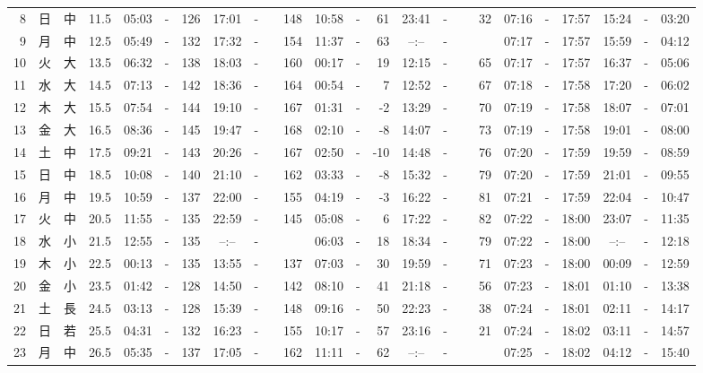 \documentclass[12pt,a4j]{jsarticle}
\begin{document}
\begin{table}[htbp]
\begin{center}
{\begin{tabular}{|rc|cr|ccrccr|ccrccr|ccc|ccc|}
 8 & 日 & 中 & 11.5 &  05:03 &-& 126 &  17:01 &-& 148 &  10:58 &-&  61 &  23:41 &-&  32 & 07:16 & -& 17:57 & 15:24 & -& 03:20 \\
 9 & 月 & 中 & 12.5 &  05:49 &-& 132 &  17:32 &-& 154 &  11:37 &-&  63 &  --:-- &-&~~~~~ & 07:17 & -& 17:57 & 15:59 & -& 04:12 \\
10 & 火 & 大 & 13.5 &  06:32 &-& 138 &  18:03 &-& 160 &  00:17 &-&  19 &  12:15 &-&  65 & 07:17 & -& 17:57 & 16:37 & -& 05:06 \\
11 & 水 & 大 & 14.5 &  07:13 &-& 142 &  18:36 &-& 164 &  00:54 &-&   7 &  12:52 &-&  67 & 07:18 & -& 17:58 & 17:20 & -& 06:02 \\
12 & 木 & 大 & 15.5 &  07:54 &-& 144 &  19:10 &-& 167 &  01:31 &-&  -2 &  13:29 &-&  70 & 07:19 & -& 17:58 & 18:07 & -& 07:01 \\
13 & 金 & 大 & 16.5 &  08:36 &-& 145 &  19:47 &-& 168 &  02:10 &-&  -8 &  14:07 &-&  73 & 07:19 & -& 17:58 & 19:01 & -& 08:00 \\
14 & 土 & 中 & 17.5 &  09:21 &-& 143 &  20:26 &-& 167 &  02:50 &-& -10 &  14:48 &-&  76 & 07:20 & -& 17:59 & 19:59 & -& 08:59 \\
15 & 日 & 中 & 18.5 &  10:08 &-& 140 &  21:10 &-& 162 &  03:33 &-&  -8 &  15:32 &-&  79 & 07:20 & -& 17:59 & 21:01 & -& 09:55 \\
16 & 月 & 中 & 19.5 &  10:59 &-& 137 &  22:00 &-& 155 &  04:19 &-&  -3 &  16:22 &-&  81 & 07:21 & -& 17:59 & 22:04 & -& 10:47 \\
17 & 火 & 中 & 20.5 &  11:55 &-& 135 &  22:59 &-& 145 &  05:08 &-&   6 &  17:22 &-&  82 & 07:22 & -& 18:00 & 23:07 & -& 11:35 \\
18 & 水 & 小 & 21.5 &  12:55 &-& 135 &  --:-- &-&~~~~~ &  06:03 &-&  18 &  18:34 &-&  79 & 07:22 & -& 18:00 & --:-- & -& 12:18 \\
19 & 木 & 小 & 22.5 &  00:13 &-& 135 &  13:55 &-& 137 &  07:03 &-&  30 &  19:59 &-&  71 & 07:23 & -& 18:00 & 00:09 & -& 12:59 \\
20 & 金 & 小 & 23.5 &  01:42 &-& 128 &  14:50 &-& 142 &  08:10 &-&  41 &  21:18 &-&  56 & 07:23 & -& 18:01 & 01:10 & -& 13:38 \\
21 & 土 & 長 & 24.5 &  03:13 &-& 128 &  15:39 &-& 148 &  09:16 &-&  50 &  22:23 &-&  38 & 07:24 & -& 18:01 & 02:11 & -& 14:17 \\
22 & 日 & 若 & 25.5 &  04:31 &-& 132 &  16:23 &-& 155 &  10:17 &-&  57 &  23:16 &-&  21 & 07:24 & -& 18:02 & 03:11 & -& 14:57 \\
23 & 月 & 中 & 26.5 &  05:35 &-& 137 &  17:05 &-& 162 &  11:11 &-&  62 &  --:-- &-&~~~~~ & 07:25 & -& 18:02 & 04:12 & -& 15:40 \\

\end{tabular}}
\end{center}
\end{table}
\end{document}
